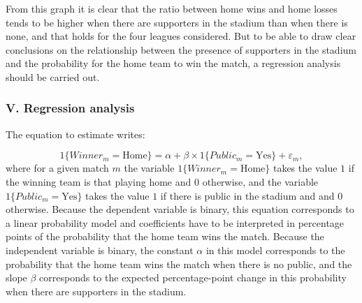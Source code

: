 \documentclass[
]{article}
\newenvironment{Shaded}{\begin{snugshade}}{\end{snugshade}}
\newcommand{\CommentTok}[1]{\textcolor[rgb]{0.56,0.35,0.01}{\textit{#1}}}
\newcommand{\DataTypeTok}[1]{\textcolor[rgb]{0.13,0.29,0.53}{#1}}
\newcommand{\DecValTok}[1]{\textcolor[rgb]{0.00,0.00,0.81}{#1}}
\newcommand{\KeywordTok}[1]{\textcolor[rgb]{0.13,0.29,0.53}{\textbf{#1}}}
\newcommand{\NormalTok}[1]{#1}
\newcommand{\OperatorTok}[1]{\textcolor[rgb]{0.81,0.36,0.00}{\textbf{#1}}}
\newcommand{\StringTok}[1]{\textcolor[rgb]{0.31,0.60,0.02}{#1}}
\begin{document}
From this graph it is clear that the ratio between home wins and home
losses tends to be higher when there are supporters in the stadium than
when there is none, and that holds for the four leagues considered. But
to be able to draw clear conclusions on the relationship between the
presence of supporters in the stadium and the probability for the home
team to win the match, a regression analysis should be carried out.

\hypertarget{v.-regression-analysis}{%
\subsubsection{V. Regression analysis}\label{v.-regression-analysis}}

The equation to estimate writes:

\[1\{Winner_m=\text{Home}\}=\alpha+\beta \times1\{Public_m=\text{Yes}\}+\varepsilon_m,\]
where for a given match \(m\) the variable \(1\{Winner_m=\text{Home}\}\)
takes the value \(1\) if the winning team is that playing home and \(0\)
otherwise, and the variable \(1\{Public_m=\text{Yes}\}\) takes the value
\(1\) if there is public in the stadium and and \(0\) otherwise. Because
the dependent variable is binary, this equation corresponds to a linear
probability model and coefficients have to be interpreted in percentage
points of the probability that the home team wins the match. Because the
independent variable is binary, the constant \(\alpha\) in this model
corresponds to the probability that the home team wins the match when
there is no public, and the slope \(\beta\) corresponds to the expected
percentage-point change in this probability when there are supporters in
the stadium.

\begin{Shaded}
\end{Shaded}
\end{document}
